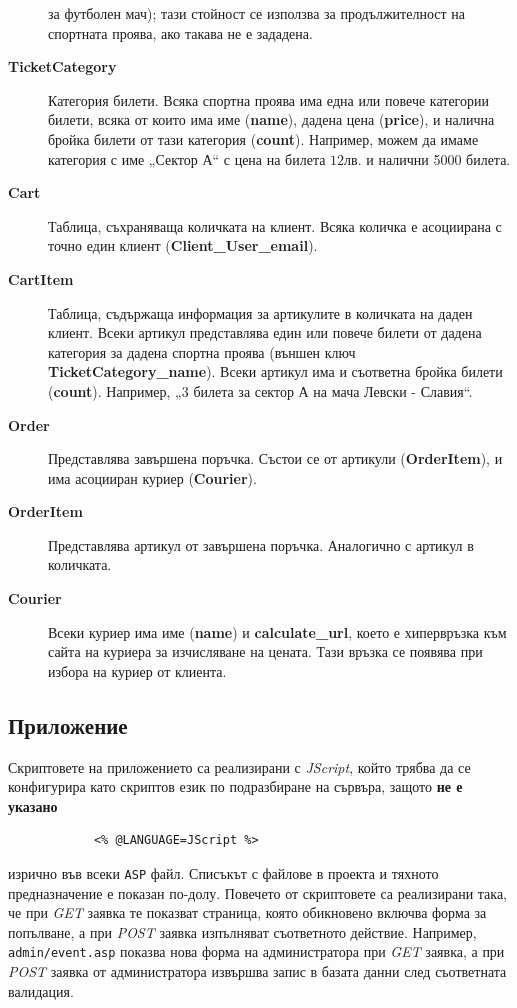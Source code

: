 \documentclass[a4paper,10pt, leqno]{article}
\newcommand{\term}[1] {\textsl{#1}}
\newcommand{\tab}[1] {\textbf{#1}}
\newcommand{\col}[1] {\textbf{#1}}
\newcommand{\File}[1] {\texttt{#1}}
\begin{document}
\begin{description}
	      за футболен мач); тази стойност се използва за продължителност на спортната проява, ако такава не е зададена.
	    \item[\tab{TicketCategory}]
	      Категория билети. Всяка спортна проява има една или повече категории билети, всяка от които има име (\col{name}), дадена цена (\col{price}),
	      и налична бройка билети от тази категория (\col{count}). Например, можем да имаме категория с име „Сектор А“ с цена на билета $12$лв. и
	      налични 5000 билета.
	    \item[\tab{Cart}]
	      Таблица, съхраняваща количката на клиент. Всяка количка е асоциирана с точно един клиент (\col{Client\_User\_email}).
	    \item[\tab{CartItem}]
	      Таблица, съдържаща информация за артикулите в количката на даден клиент. Всеки артикул представлява един или повече
	      билети от дадена категория за дадена спортна проява (външен ключ \col{TicketCategory\_name}). Всеки артикул има и съответна
	      бройка билети (\col{count}). Например, „3 билета за сектор А на мача Левски - Славия“.
	    \item[\tab{Order}]
	      Представлява завършена поръчка. Състои се от артикули (\tab{OrderItem}), и има асоцииран куриер (\tab{Courier}).
	    \item[\tab{OrderItem}]
	      Представлява артикул от завършена поръчка. Аналогично с артикул в количката.
	     \item[\tab{Courier}]
	       Всеки куриер има име (\col{name}) и \col{calculate\_url}, което е хипервръзка към сайта на куриера за изчисляване на цената.
	       Тази връзка се появява при избора на куриер от клиента.
	\end{description}

	\subsection{Приложение}
		Скриптовете на приложението са реализирани с \term{JScript}, който трябва да се конфигурира като скриптов език
		по подразбиране на сървъра, защото \textbf{не е указано}

		\begin{verbatim}
			<% @LANGUAGE=JScript %>
		\end{verbatim}
		изрично във всеки \texttt{ASP} файл.
		Списъкът с файлове в проекта и тяхното предназначение е показан по-долу.
		Повечето от скриптовете са реализирани така, че при \term{GET} заявка те показват страница, която обикновено включва форма
		за попълване, а при \term{POST} заявка изпълняват съответното действие.
		Например, \File{admin/event.asp} показва нова форма на администратора при \term{GET} заявка, а при \term{POST} заявка от администратора
		извършва запис в базата данни след съответната валидация.
\end{document}
